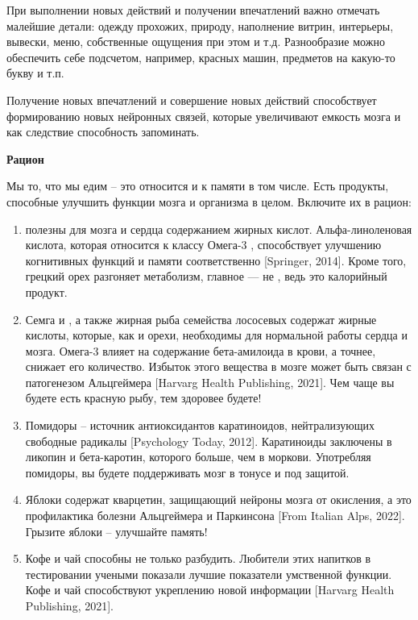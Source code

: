 При выполнении новых действий и получении впечатлений важно отмечать малейшие детали: одежду прохожих, природу, наполнение витрин, интерьеры, вывески, меню, собственные ощущения при этом и т.д. Разнообразие можно обеспечить себе подсчетом, например, красных машин, предметов на какую-то букву и т.п.

Получение новых впечатлений и совершение новых действий способствует формированию новых нейронных связей, которые увеличивают емкость мозга и как следствие способность запоминать.

\textbf{Рацион}

Мы то, что мы едим – это относится и к памяти в том числе. Есть продукты, способные улучшить функции мозга и организма в целом. Включите их в рацион:

\begin{enumerate}
    \item {} полезны для мозга и сердца содержанием жирных кислот. Альфа-линоленовая кислота, которая относится к классу Омега-3 , способствует улучшению когнитивных функций и памяти соответственно [Springer, 2014]. Кроме того, грецкий орех разгоняет метаболизм, главное --- не , ведь это калорийный продукт.
    \item Семга и , а также жирная рыба семейства лососевых содержат жирные кислоты, которые, как и орехи, необходимы для нормальной работы сердца и мозга. Омега-3 влияет на содержание бета-амилоида в крови, а точнее, снижает его количество. Избыток этого вещества в мозге может быть связан с патогенезом Альцгеймера [Harvarg Health Publishing, 2021]. Чем чаще вы будете есть красную рыбу, тем здоровее будете!
    \item Помидоры – источник антиоксидантов каратиноидов, нейтрализующих свободные радикалы [Psychology Today, 2012]. Каратиноиды заключены в ликопин и бета-каротин, которого больше, чем в моркови. Употребляя помидоры, вы будете поддерживать мозг в тонусе и под защитой.
    \item Яблоки содержат кварцетин, защищающий нейроны мозга от окисления, а это профилактика болезни Альцгеймера и Паркинсона [From Italian Alps, 2022]. Грызите яблоки – улучшайте память!
    \item Кофе и чай способны не только разбудить. Любители этих напитков в тестировании учеными показали лучшие показатели умственной функции. Кофе и чай способствуют укреплению новой информации [Harvarg Health Publishing, 2021].
\end{enumerate}

